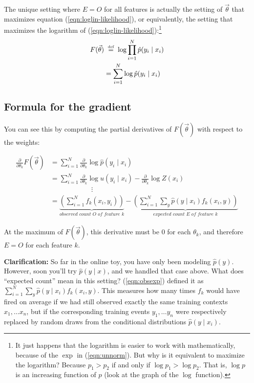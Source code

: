 \documentclass[11pt]{article}
\newcommand{\defeq}{\;\stackrel{\mbox{\tiny def}}{=}\;}
\newcommand{\vtheta}{\vec{\theta}}
\newcommand{\ph}{\hat{p}}
\newcommand{\diffk}{\frac{\partial}{\partial \theta_k}}
\begin{document}
The unique setting where $E=O$ for all features is actually the
setting of $\vtheta$ that maximizes equation
(\ref{eqn:loglin-likelihood}), or equivalently, the setting that
maximizes the logarithm of (\ref{eqn:loglin-likelihood}):\footnote{It
  just happens that the logarithm is easier to work with
  mathematically, because of the $\exp$ in (\ref{eqn:unnorm}).  But
  why is it equivalent to maximize the logarithm?  Because $p_1 > p_2$
  if and only if $\log p_1 > \log p_2$.  That is, $\log p$ is
  an increasing function of $p$ (look at the graph of the $\log$ function).%
}
\begin{align}
  F(\vtheta) & \defeq \log \prod_{i=1}^N \ph(y_i \mid x_i) \\ \label{eqn:loglin-log-likelihood}
             & = \sum_{i=1}^N \log \ph(y_i \mid x_i) 
\end{align}

\subsection{Formula for the gradient}

You can see this by computing the partial derivatives of $F(\vtheta)$ 
with respect to the weights:

\begin{align}
  \diffk F(\vtheta) 
  &= \sum_{i=1}^N \diffk \log \ph(y_i \mid x_i)  \\ %
  &= \sum_{i=1}^N \diffk \log u(y_i \mid x_i) - \diffk \log Z(x_i) \\
  & \hspace{1in}\vdots \nonumber \\ 
  &= \underbrace{\left( \sum_{i=1}^N f_k(x_i,y_i) \right)}_{\textit{observed count $O$ of feature $k$}}
  - \underbrace{\left( \sum_{i=1}^N \sum_y \ph(y\mid x_i) f_k(x_i,y) \right)}_{\textit{expected count $E$ of feature $k$}} \label{eqn:obsexp}
\end{align}

At the maximum of $F(\vtheta)$, this derivative must be 0 for each
$\theta_k$, and therefore $E=O$ for each feature $k$.  

{\bf Clarification:} So far in the online toy, you have only been
modeling $\ph(y)$.  However, soon you'll try $\ph(y\mid x)$, and we
handled that case above.  What does ``expected count'' mean in this
setting?  (\ref{eqn:obsexp}) defined it as $\sum_{i=1}^N \sum_y
\ph(y\mid x_i) f_k(x_i,y)$.  This measures how many times $f_k$ would
have fired on average if we had still observed exactly the same
training contexts $x_1,\ldots x_n$, but if the corresponding training events
$y_1,\ldots y_n$ were respectively replaced by random draws from the
conditional distributions $\ph(y \mid x_i)$.
\end{document}
